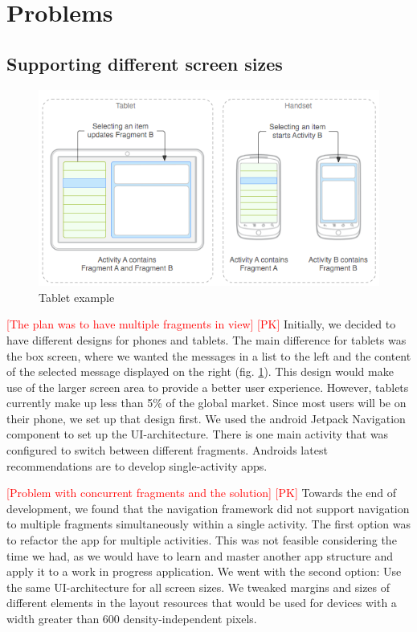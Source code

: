 \documentclass[acmlarge, review=false, screen=true]{acmart}
\begin{document}
  \section{Problems}

    \subsection{Supporting different screen sizes}
      \begin{figure}
        \includegraphics[width=\textwidth]{images/FRAGMENTS.png}
        \caption{Tablet example}
        \label{fig:tablet-view}
      \end{figure}

      \textcolor{red}{[The plan was to have multiple fragments in view] [PK]} \newline
      Initially, we decided to have different designs for phones and tablets. The main difference for tablets was the box screen, where we wanted the messages in a list to the left and the content of the selected message displayed on the right (fig. \ref{fig:tablet-view}). This design would make use of the larger screen area to provide a better user experience. However, tablets currently make up less than 5\% of the global market\cite{statcounter}. Since most users will be on their phone, we set up that design first. We used the android Jetpack Navigation component to set up the UI-architecture\cite{navigation}. There is one main activity that was configured to switch between different fragments. Androids latest recommendations are to develop single-activity apps\cite{singleactivity}. 

      \textcolor{red}{[Problem with concurrent fragments and the solution] [PK]} \newline
      Towards the end of development, we found that the navigation framework did not support navigation to multiple fragments simultaneously within a single activity. The first option was to refactor the app for multiple activities. This was not feasible considering the time we had, as we would have to learn and master another app structure and apply it to a work in progress application. We went with the second option: Use the same UI-architecture for all screen sizes. We tweaked margins and sizes of different elements in the layout resources that would be used for devices with a width greater than 600 density-independent pixels. 
\end{document}

